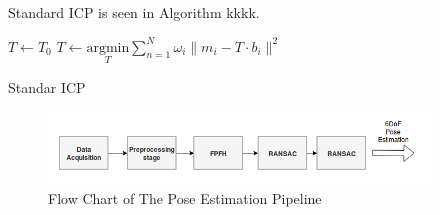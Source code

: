 Standard ICP is seen in Algorithm kkkk.

\begin{algorithm}[H]
\SetAlgoLined
{}
 $T \leftarrow T_{0}$  \;
 {
   $T \leftarrow \underset{T}{\mathrm{argmin}} {\sum \limits_{n=1}^{N}\omega _{i}\|m_{i}-T \cdot b_{i}\|^{2}}$\;
}
\caption{Standar ICP}
\label{alg:algICP}
\end{algorithm}

\begin{figure}[!h]
\begin{center}
\includegraphics[width=4in]{diagrams/endpipeline.png}
\caption{Flow Chart of The Pose Estimation Pipeline}
\label{fig:icp}
\end{center}
\end{figure}




































